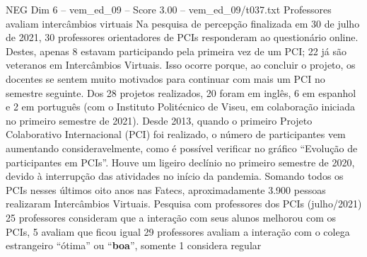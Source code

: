 \begin{textsample}{NEG Dim 6 – vem\_ed\_09 – Score 3.00 – vem\_ed\_09/t037.txt}  \label{ex:f6_neg_030}
Professores avaliam intercâmbios virtuais Na pesquisa de percepção finalizada em 30 de julho de 2021, 30 professores orientadores de PCIs responderam ao questionário online.
Destes, apenas 8 estavam participando pela primeira vez de um PCI; 22 já são veteranos em Intercâmbios Virtuais.
Isso ocorre porque, ao concluir o projeto, os docentes se sentem muito motivados para continuar com mais um PCI no semestre seguinte.
Dos 28 projetos realizados, 20 foram em inglês, 6 em espanhol e 2 em português (com o Instituto Politécnico de Viseu, em colaboração iniciada no primeiro semestre de 2021).
Desde 2013, quando o primeiro Projeto Colaborativo Internacional (PCI) foi realizado, o número de participantes vem aumentando consideravelmente, como é possível verificar no gráfico “Evolução de participantes em PCIs”.
Houve um ligeiro declínio no primeiro semestre de 2020, devido à interrupção das atividades no início da pandemia.
Somando todos os PCIs nesses últimos oito anos nas Fatecs, aproximadamente 3.900 pessoas realizaram Intercâmbios Virtuais.
Pesquisa com professores dos PCIs (julho/2021) 25 professores consideram que a interação com seus alunos melhorou com os PCIs, 5 avaliam que ficou igual 29 professores avaliam a interação com o colega estrangeiro “ótima” ou “\textbf{boa}”, somente 1 considera regular

\end{textsample}
